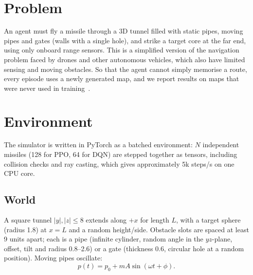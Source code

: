 \documentclass[10pt,a4paper,twocolumn]{article}
\begin{document}

\section{Problem}

An agent must fly a missile through a 3D tunnel filled with
static pipes, moving pipes and gates (walls with a single hole),
and strike a target core at the far end, using only onboard range
sensors. This is a simplified version of the navigation problem
faced by drones and other autonomous vehicles, which also have
limited sensing and moving obstacles. So that the agent cannot
simply memorise a route, every episode uses a newly generated
map, and we report results on maps that were never used in
training~\cite{cobbe2019}.

\section{Environment}

The simulator is written in PyTorch as a batched environment:
$N$ independent missiles (128 for PPO, 64 for DQN) are stepped
together as tensors, including collision checks and ray casting,
which gives approximately 5k steps/s on one CPU core.

\subsection*{World}

A square tunnel $|y|,|z|\leq 8$ extends along $+x$ for length
$L$, with a target sphere (radius 1.8) at $x=L$ and a random
height/side. Obstacle slots are spaced at least 9 units apart;
each is a pipe (infinite cylinder, random angle in the $yz$-plane,
offset, tilt and radius 0.8--2.6) or a gate (thickness 0.6,
circular hole at a random position). Moving pipes oscillate:
\begin{equation}
  p(t)=p_0+mA\sin(\omega t+\phi).
\end{equation}
\end{document}
